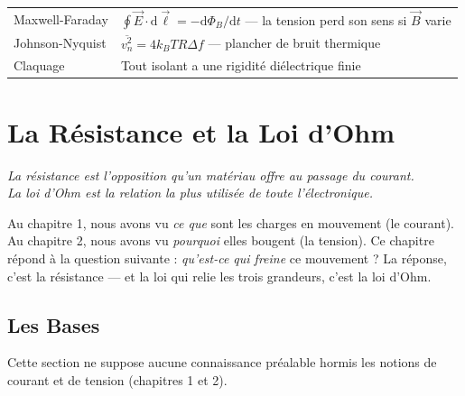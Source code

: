 \documentclass[12pt,a4paper,twoside]{book}
\begin{document}
\begin{ingenieur}[title={\color{white} Résumé --- Niveau Ingénieur}]
\begin{center}
\renewcommand{\arraystretch}{1.3}
\begin{tabular}{p{4cm}p{9cm}}
\toprule
Maxwell-Faraday & $\oint\vec{E}\cdot\mathrm{d}\vec{\ell} = -\mathrm{d}\Phi_B/\mathrm{d}t$ --- la tension perd son sens si $\vec{B}$ varie \\
Johnson-Nyquist & $\overline{v_n^2} = 4k_BTR\Delta f$ --- plancher de bruit thermique \\
Claquage & Tout isolant a une rigidité diélectrique finie \\
\bottomrule
\end{tabular}
\end{center}
\end{ingenieur}

\chapter{La Résistance et la Loi d'Ohm}

\begin{center}
\textit{La résistance est l'opposition qu'un matériau offre au passage du courant.\\
La loi d'Ohm est la relation la plus utilisée de toute l'électronique.}
\end{center}

\vspace{0.3cm}

Au chapitre 1, nous avons vu \textit{ce que} sont les charges en mouvement (le courant). Au chapitre 2, nous avons vu \textit{pourquoi} elles bougent (la tension). Ce chapitre répond à la question suivante : \textit{qu'est-ce qui freine} ce mouvement ? La réponse, c'est la résistance — et la loi qui relie les trois grandeurs, c'est la loi d'Ohm.

\section{Les Bases}

\begin{bases}
Cette section ne suppose aucune connaissance préalable hormis les notions de courant et de tension (chapitres 1 et 2).
\end{bases}
\end{document}
